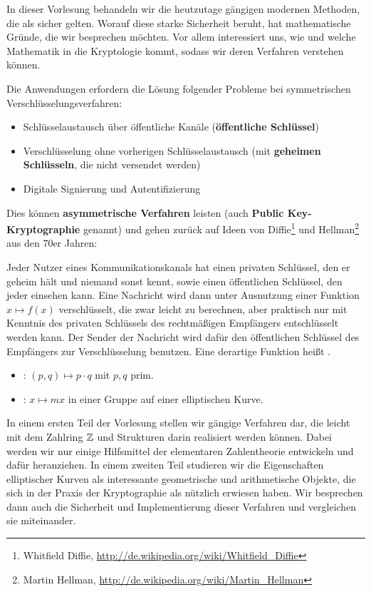 In dieser Vorlesung behandeln wir die heutzutage gängigen modernen Methoden, die als sicher gelten. 
Worauf diese starke Sicherheit beruht, hat mathematische Gründe, die wir besprechen möchten. 
Vor allem interessiert uns, wie und welche Mathematik in die Kryptologie kommt, sodass wir deren Verfahren verstehen können. 

Die Anwendungen erfordern die Lösung folgender Probleme bei symmetrischen Verschlüsselungsverfahren:

\begin{itemize}
	\item Schlüsselaustausch über öffentliche Kanäle (\textbf{öffentliche Schlüssel})
	\item Verschlüsselung ohne vorherigen Schlüsselaustausch (mit \textbf{geheimen Schlüsseln}, die nicht versendet werden)
	\item Digitale Signierung und Autentifizierung
\end{itemize}

Dies können \textbf{asymmetrische Verfahren} leisten (auch \textbf{Public Key-Kryptographie} genannt) und gehen zurück auf Ideen von Diffie\footnote{Whitfield Diffie, \url{http://de.wikipedia.org/wiki/Whitfield_Diffie}} und Hellman\footnote{Martin Hellman, \url{http://de.wikipedia.org/wiki/Martin_Hellman}} aus den 70er Jahren:

Jeder Nutzer eines Kommunikationskanals hat einen privaten Schlüssel, den er geheim hält und niemand sonst kennt, sowie einen öffentlichen Schlüssel, den jeder einsehen kann. 
Eine Nachricht wird dann unter Ausnutzung einer Funktion $x \mapsto f(x)$ verschlüsselt, die zwar leicht zu berechnen, aber praktisch nur mit Kenntnis des privaten Schlüssels des rechtmäßigen Empfängers entschlüsselt werden kann. 
Der Sender der Nachricht wird dafür den öffentlichen Schlüssel des Empfängers zur Verschlüsselung benutzen. 
Eine derartige Funktion heißt .

\begin{itemize}
	\item {}: $(p,q) \mapsto p \cdot q$ mit $p,q$ prim.
	\item {}: $x \mapsto mx$ in einer Gruppe auf einer elliptischen Kurve.
\end{itemize}

In einem ersten Teil der Vorlesung stellen wir gängige Verfahren dar, die leicht mit dem Zahlring $\mathbb{Z}$ und Strukturen darin realisiert werden können. 
Dabei werden wir nur einige Hilfsmittel der elementaren Zahlentheorie entwickeln und dafür heranziehen. 
In einem zweiten Teil studieren wir die Eigenschaften elliptischer Kurven als interessante geometrische und arithmetische Objekte, die sich in der Praxis der Kryptographie als nützlich erwiesen haben. 
Wir besprechen dann auch die Sicherheit und Implementierung dieser Verfahren und vergleichen sie miteinander.

